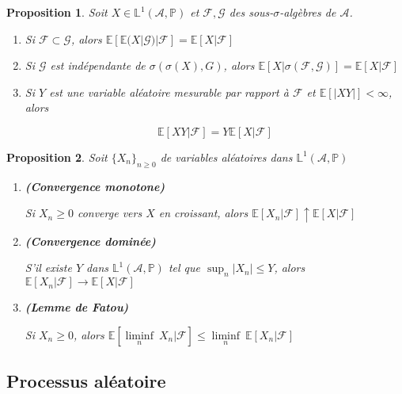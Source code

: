 \documentclass[10pt,a4paper,oneside]{article}
\newtheorem{proposition}{Proposition}
\begin{document}
\begin{proposition}
Soit $X \in \mathbb{L}^1(\mathcal{A},\mathbb{P})$ et $\mathcal{F},\mathcal{G}$ des sous-$\sigma$-algèbres de $\mathcal{A}$.

\begin{enumerate}
\item
Si $\mathcal{F} \subset \mathcal{G}$, alors $ \mathbb{E}[ \mathbb{E}(X | \mathcal{G}) | \mathcal{F} ] = \mathbb{E}[X | \mathcal{F}] $

\item
Si $\mathcal{G}$ est indépendante de $\sigma(\sigma(X),G)$, alors $\mathbb{E}[X | \sigma(\mathcal{F},\mathcal{G})] = \mathbb{E}[X | \mathcal{F}]$

\item
Si $Y$ est une variable aléatoire mesurable par rapport à $\mathcal{F}$ et $\mathbb{E}[|XY|] < \infty$, alors

\[ \mathbb{E}[XY | \mathcal{F}] = Y \mathbb{E}[X | \mathcal{F}] \]
\end{enumerate}
\end{proposition}

\begin{proposition}
Soit $\{ X_n \}_{n \geq 0}$ de variables aléatoires dans $\mathbb{L}^1(\mathcal{A}, \mathbb{P})$

\begin{enumerate}
\item
\textbf{(Convergence monotone)}

Si $X_n \geq 0$ converge vers $X$ en croissant, alors $ \mathbb{E}[X_n | \mathcal{F}] \uparrow \mathbb{E}[X | \mathcal{F}] $

\item
\textbf{(Convergence dominée)}

S'il existe $Y$ dans $\mathbb{L}^1(\mathcal{A},\mathbb{P})$ tel que $\sup_n |X_n| \leq Y$, alors $\mathbb{E}[X_n | \mathcal{F}] \to \mathbb{E}[X | \mathcal{F}]$

\item
\textbf{(Lemme de Fatou)}

Si $X_n \geq 0$, alors $ \mathbb{E}[ \underset{n}{\liminf}\ X_n | \mathcal{F}] \leq \underset{n}{\liminf}\ \mathbb{E}[X_n | \mathcal{F}] $
\end{enumerate}
\end{proposition}

\subsection{Processus aléatoire}
\end{document}

